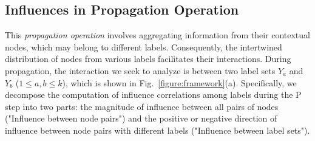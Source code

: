 \subsection{Influences in Propagation Operation} \label{sec:forw}
This \emph{propagation operation} involves aggregating information from their contextual nodes, which may belong to different labels. Consequently, the intertwined distribution of nodes from various labels facilitates their interactions.
During propagation, the interaction we seek to analyze is between two label sets $Y_a$ and $Y_b$ ($1 \leq a, b \leq k$), which is shown in Fig.~\ref{figure:framework}(a).
Specifically, 
we decompose the computation of influence correlations among labels during the P step into two parts: the magnitude of influence between all pairs of nodes ("Influence between node pairs") and the positive or negative direction of influence between node pairs with different labels ("Influence between label sets").


